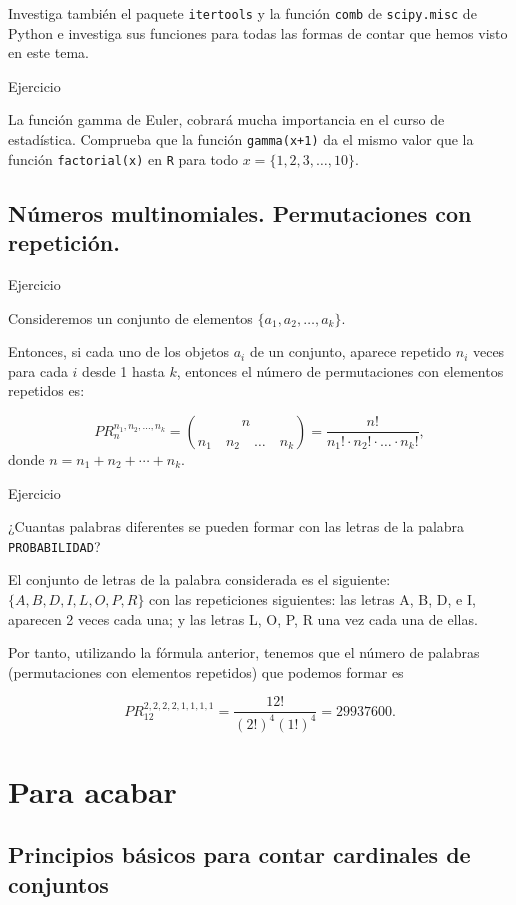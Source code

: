 \documentclass[
  letterpaper,
  DIV=11,
  numbers=noendperiod]{scrreprt}
\begin{document}
Investiga también el paquete \texttt{itertools} y la función
\texttt{comb} de \texttt{scipy.misc} de Python e investiga sus funciones
para todas las formas de contar que hemos visto en este tema.

Ejercicio

La función gamma de Euler, cobrará mucha importancia en el curso de
estadística. Comprueba que la función \texttt{gamma(x+1)} da el mismo
valor que la función \texttt{factorial(x)} en \texttt{R} para todo
\(x = \{1,2,3,\ldots,10\}\).

\subsection{Números multinomiales. Permutaciones con
repetición.}\label{nuxfameros-multinomiales.-permutaciones-con-repeticiuxf3n.}

Ejercicio

Consideremos un conjunto de elementos \(\{a_1, a_2, \ldots, a_k\}\).

Entonces, si cada uno de los objetos \(a_i\) de un conjunto, aparece
repetido \(n_i\) veces para cada \(i\) desde 1 hasta \(k\), entonces el
número de permutaciones con elementos repetidos es:

\[PR_n^{n_1,n_2,\ldots,n_k} = {{n}\choose {n_1\quad n_2 \quad\ldots \quad n_k}}=\frac{n!}{n_1!\cdot n_2!\cdot \ldots \cdot n_k!},\]
donde \(n=n_1+n_2+\cdots+n_k\).

Ejercicio

¿Cuantas palabras diferentes se pueden formar con las letras de la
palabra \texttt{PROBABILIDAD}?

El conjunto de letras de la palabra considerada es el siguiente:
\(\{A, B, D, I, L, O, P, R\}\) con las repeticiones siguientes: las
letras A, B, D, e I, aparecen 2 veces cada una; y las letras L, O, P, R
una vez cada una de ellas.

Por tanto, utilizando la fórmula anterior, tenemos que el número de
palabras (permutaciones con elementos repetidos) que podemos formar es

\[PR^{2,2,2,2,1,1,1,1}_{12} = \frac{12!}{(2!)^4(1!)^4} = 29937600.\]

\section{Para acabar}\label{para-acabar}

\subsection{Principios básicos para contar cardinales de
conjuntos}\label{principios-buxe1sicos-para-contar-cardinales-de-conjuntos}
\end{document}

